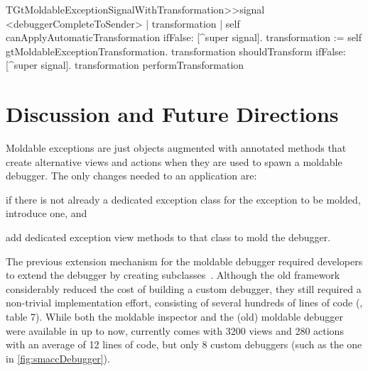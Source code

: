 \documentclass[sigplan,screen]{acmart} %
\newcommand\on[1]{\nbc{ON}{#1}{olive}} %
\newcommand{\GT}{\lst{GT}\xspace} %
\begin{document}
\begin{code}
TGtMoldableExceptionSignalWithTransformation>>signal
	<debuggerCompleteToSender>
	| transformation |
	self canApplyAutomaticTransformation ifFalse: [^super signal].
	transformation := self gtMoldableExceptionTransformation.
	transformation shouldTransform ifFalse: [^super signal].
	transformation performTransformation
\end{code}


\section{Discussion and Future Directions}\label{sec:directions}

Moldable exceptions are just objects augmented with annotated methods that create alternative views and actions when they are used to spawn a moldable debugger.
The only changes needed to an application are:
\begin{inparaenum}[(i)]
	\item if there is not already a dedicated exception class for the exception to be molded, introduce one, and
	\item add dedicated exception view methods to that class to mold the debugger.
\end{inparaenum}


The previous extension mechanism for the moldable debugger required developers to extend the debugger by creating subclasses~\cite{Chis15c}.
Although the old framework considerably reduced the cost of building a custom debugger, they still required a non-trivial implementation effort, consisting of several hundreds of lines of code (\cite{Chis15c}, table 7).
While both the moldable inspector and the (old) moldable debugger were available in \GT up to now, currently \GT comes with 3200 views and 280 actions with an average of 12 lines of code, but only 8 custom debuggers (such as the one in  \autoref{fig:smaccDebugger}).
\end{document}
